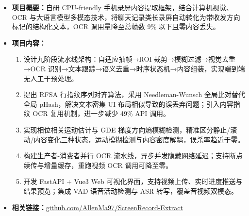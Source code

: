 \begin{itemize}
    \item \textbf{项目概要：}自研 CPU-friendly 手机录屏内容提取框架，结合计算机视觉、OCR 与大语言模型多模态技术，将聊天记录类长录屏自动转化为带收发方向标记的结构化文本，OCR 调用量降至总帧数 9\% 以下且零内容丢失。
    \item \textbf{项目内容：}
    \begin{enumerate}
        \item 设计九阶段流水线架构：自适应抽帧→ROI 裁剪→模糊过滤→视觉去重→OCR 识别→文本跟踪→语义去重→时序状态机→内容组装，实现端到端无人工干预处理。
        \item 提出 RFSA 行指纹序列对齐算法，采用 Needleman-Wunsch 全局比对替代全局 pHash，解决文本密集 UI 布局相似导致的误丢弃问题；引入内容指纹 OCR 复用机制，进一步减少 49\% API 调用。
        \item 实现相位相关运动估计与 GDE 梯度方向熵模糊检测，精准区分静止/滚动/内容变化三种状态，运动模糊检测与内容密度解耦，误杀率趋近于零。
        \item 构建生产者-消费者并行 OCR 流水线，异步并发隐藏网络延迟；支持断点续传与增量缓存，重跑视频 OCR 调用可降至零。
        \item 开发 FastAPI + Vue3 Web 可视化界面，支持视频上传、实时进度推送与结果预览；集成 VAD 语音活动检测与 ASR 转写，覆盖音视频双模态。
    \end{enumerate}
    \item \textbf{相关链接：}\href{https://github.com/AllenMa97/ScreenRecord-Extract}{github.com/AllenMa97/ScreenRecord-Extract}
\end{itemize}
